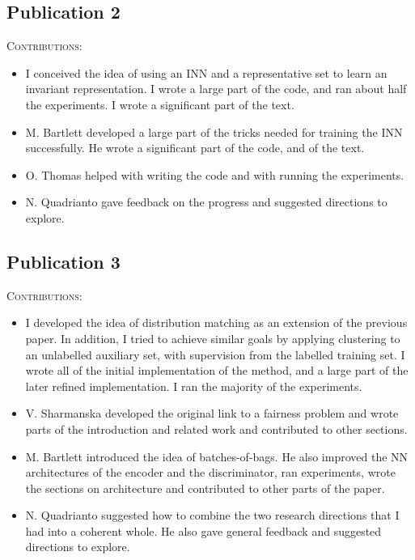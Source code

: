 \subsection{Publication 2}
\begin{refsection}[allreferences]
    \nocite{kehrenberg2020nullsampling}
    \printbibliography[heading=none]
\end{refsection}%
\noindent\textsc{Contributions:}
\begin{itemize}
  \item I conceived the idea of using an \acf{INN} and a representative set to learn an invariant representation. I wrote a large part of the code, and ran about half the experiments. I wrote a significant part of the text.
  \item M. Bartlett developed a large part of the tricks needed for training the \ac{INN} successfully. He wrote a significant part of the code, and of the text.
  \item O. Thomas helped with writing the code and with running the experiments.
  \item N. Quadrianto gave feedback on the progress and suggested directions to explore.
\end{itemize}

\subsection{Publication 3}
\begin{refsection}[allreferences]
    \nocite{kehrenberg2020zeroshot}
    \printbibliography[heading=none]
\end{refsection}%
\noindent\textsc{Contributions:}
\begin{itemize}
  \item I developed the idea of distribution matching as an extension of the previous paper. In addition, I tried to achieve similar goals by applying clustering to an unlabelled auxiliary set, with supervision from the labelled training set. I wrote all of the initial implementation of the method, and a large part of the later refined implementation. I ran the majority of the experiments.
  \item V. Sharmanska developed the original link to a fairness problem and wrote parts of the introduction and related work and contributed to other sections.
  \item M. Bartlett introduced the idea of batches-of-bags. He also improved the \ac{NN} architectures of the encoder and the discriminator, ran experiments, wrote the sections on architecture and contributed to other parts of the paper.
  \item N. Quadrianto suggested how to combine the two research directions that I had into a coherent whole. He also gave general feedback and suggested directions to explore.
\end{itemize}


